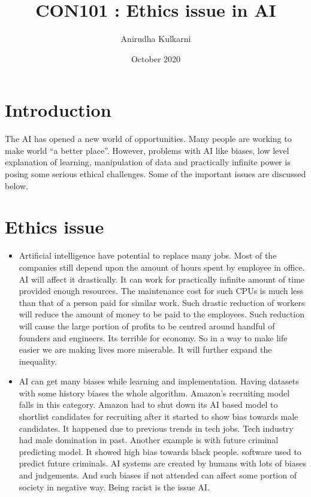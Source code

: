\documentclass{article}
\title{CON101 : Ethics issue in AI}
\author{Anirudha Kulkarni}
\date{October 2020}
\begin{document}
\maketitle
\section{Introduction}
The AI has opened a new world of opportunities. Many people are working to make world “a better place”. However, problems with AI like biases, low level explanation of learning, manipulation of data and practically infinite power is posing some serious ethical challenges. Some of the important issues are discussed below.
\section{Ethics issue}
\begin{itemize}
    \item Artificial intelligence have potential to replace many jobs. Most of the companies still depend upon the amount of hours spent by employee in office. AI will affect it drastically. It can work for practically infinite amount of time provided enough resources. The maintenance cost for such CPUs is much less than that of a person paid for similar work. Such drastic reduction of workers will reduce the amount of money to be paid to the employees. Such reduction will cause the large portion of profits to be centred around handful of founders and engineers. Its terrible for economy. So in a way to make life easier we are making lives more miserable. It will further expand the inequality.
\item AI can get many biases  while learning and implementation. Having datasets with some history biases the whole algorithm. Amazon’s recruiting model falls in this category. Amazon had to shut down its AI based model to shortlist candidates for recruiting after it started to show bias towards male candidates. It happened due to previous trends in tech jobs. Tech industry had male domination in past. Another example is with future criminal predicting model. It showed high bias towards black people.   software used to predict future criminals. AI systems are created by humans with lots of biases and judgements. And such biases if not attended can affect some portion of society in negative way. Being racist is the issue AI. 


\end{itemize}
\end{document}
